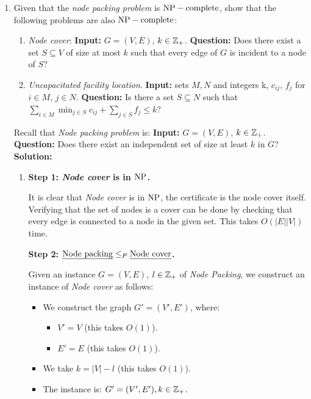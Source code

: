 \documentclass[../open-optimization/open-optimization.tex]{subfiles}
\begin{document}
\begin{enumerate}
\begin{enumerate}
{\bf Conclusion:}	the optimization version of the TSP problem is $\NP$-hard.
	
\end{enumerate}


\item Given that the {\em node packing problem} is $\text{NP}-\text{complete}$, show that the following problems are also $\text{NP}-\text{complete}$:
\begin{enumerate}
	\item {\em Node cover}: {\bf Input:} $G=(V,E)$, $k\in {\mathbb{Z}}_+$. {\bf Question:}  Does there exist a set $S\subseteq V$ of size at most $k$ such that every edge of $G$ is incident to a node of $S$?
	\item {\em Uncapacitated facility location}. {\bf Input:} sets $M,N$ and integers k, $c_{ij}$, $f_j$ for $i\in M$, $j\in N$. {\bf Question:} Is there a set $S\subseteq N$ such that $\sum_{i\in M}\min_{j\in S} c_{ij} + \sum_{j\in S}f_j \leq k$? 
\end{enumerate}

Recall that {\em Node packing problem} is: {\bf Input:} $G=(V,E)$, $k\in {\mathbb{Z}}_+$. {\bf Question:} Does there exist an independent set of size at least $k$ in $G$?\\

{\bf \Large Solution:}\\

\begin{enumerate}
	\item {\bf Step 1: {\em Node cover}  is in $\NP$.} 
	
	It is clear that {\em Node cover} is in $\NP$, the certificate is the node cover itself. Verifying that the set of nodes is a cover can be done by checking that every edge is connected to a node in the given set. This takes $O(|E||V|)$ time. 
	
 {\bf Step 2: $\text{{\em Node packing}}\leq_P\text{{\em Node cover}}$.} 
	
	Given an instance $G=(V,E)$, $l\in{\mathbb{Z}}_+$ of {\em Node Packing}, we construct an instance of {\em Node cover} as follows:
	\begin{itemize}
		\item We construct the graph $G'=(V',E')$, where:
		\begin{itemize}
			\item $V'=V$ (this takes $O(1)$). 
			\item $E'=E$ (this takes $O(1)$).
		\end{itemize}
		\item We take $k=|V|-l$ (this takes $O(1)$).
		\item The instance is: $G'=(V',E'), k\in{\mathbb{Z}}_+$. 
	\end{itemize}
	

\end{enumerate}
\end{enumerate}
\end{document}
